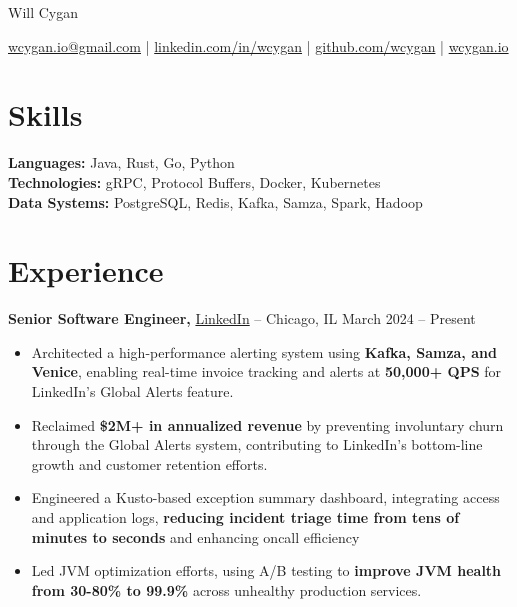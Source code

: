 \documentclass[11pt]{article}
\begin{document}
\centerline{\Huge Will Cygan}

\vspace{5pt}

\centerline{\href{mailto:wcygan.io@gmail.com}{wcygan.io@gmail.com} | \href{https://linkedin.com/in/wcygan}{linkedin.com/in/wcygan} | \href{https://github.com/wcygan}{github.com/wcygan} | \href{https://www.wcygan.io}{wcygan.io}}

\vspace{-10pt}

\section*{Skills}
\textbf{Languages:} Java, Rust, Go, Python \\
\textbf{Technologies:} gRPC, Protocol Buffers, Docker, Kubernetes \\
\textbf{Data Systems:} PostgreSQL, Redis, Kafka, Samza, Spark, Hadoop

\vspace{-6.5pt}

\section*{Experience}
\textbf{Senior Software Engineer,} \href{https://www.linkedin.com/}{LinkedIn} -- Chicago, IL \hfill March 2024 -- Present \\
\vspace{-9pt}
\begin{itemize}
  \item Architected a high-performance alerting system using \textbf{Kafka, Samza, and Venice}, enabling real-time invoice tracking and alerts at \textbf{50,000+ QPS} for LinkedIn's Global Alerts feature.
  \item Reclaimed \textbf{\$2M+ in annualized revenue} by preventing involuntary churn through the Global Alerts system, contributing to LinkedIn's bottom-line growth and customer retention efforts.
  \item Engineered a Kusto-based exception summary dashboard, integrating access and application logs, \textbf{reducing incident triage time from tens of minutes to seconds} and enhancing oncall efficiency
  \item Led JVM optimization efforts, using A/B testing to \textbf{improve JVM health from 30-80\% to 99.9\%} across unhealthy production services.
\end{itemize}
\end{document}
